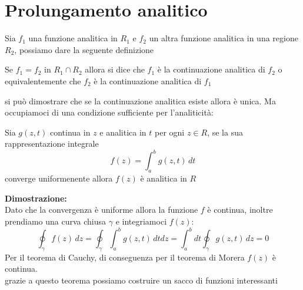 \section{Prolungamento analitico}
Sia $f_1$ una funzione analitica in $R_1$ e $f_2$ un altra funzione analitica in una regione $R_2$, possiamo dare la seguente definizione
\begin{dfn}
Se $f_1 = f_2$ in $R_1 \cap R_2$ allora si dice che $f_1$ è la continuazione analitica di $f_2$ o equivalentemente che $f_2$ è la continuazione analitica di $f_1$
\end{dfn}
si può dimostrare che se la continuazione analitica esiste allora è unica. Ma occupiamoci di una condizione sufficiente per l'analiticità:
\begin{thm}
Sia $g(z,t)$ continua in $z$ e analitica in $t$ per ogni $z\in R$, se la sua rappresentazione integrale
\[f(z) = \int_a^bg(z,t)\,dt\]
converge uniformenente allora $f(z)$ è analitica in $R$
\end{thm}
\hspace{-1.6em}\textbf{Dimostrazione:}\\
Dato che la convergenza è uniforme allora la funzione $f$ è continua, inoltre prendiamo una curva chiusa $\gamma$ e integriamoci $f(z)$:
\[\oint_\gamma f(z)\,dz = \oint_\gamma\int_a^bg(z,t)\,dtdz = \int_a^bdt\oint_\gamma g(z,t)\,dz = 0\]
Per il teorema di Cauchy, di conseguenza per il teorema di Morera $f(z)$ è continua.\\
\newline
grazie a questo teorema possiamo costruire un sacco di funzioni interessanti
